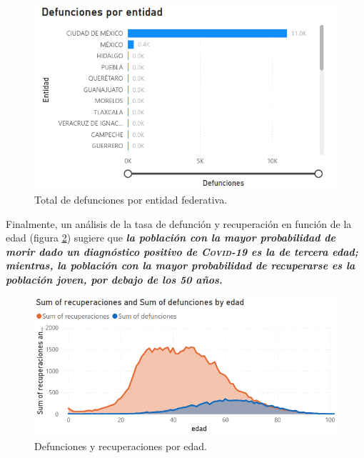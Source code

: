 \documentclass[a4paper,12pt]{article}
\begin{document}
\begin{figure}[!ht]
    \begin{center}
	\includegraphics[scale=0.8]{Def_por_entidad_powerbi.png}
    \end{center}
    \captionsetup{width=\linewidth}
    \caption{Total de defunciones por entidad federativa.}
    \label{fig:def_por_entidad}
\end{figure}

Finalmente, un análisis de la tasa de defunción y recuperación en función de la edad (figura \ref{fig:def_rec_por_edad}) sugiere que {\bfseries {\slshape la población con la mayor probabilidad de morir dado un diagnóstico positivo de {\scshape Covid-19} es la de tercera edad; mientras, la población con la mayor probabilidad de recuperarse es la población joven, por debajo de los 50 años.}}

\begin{figure}[!ht]
    \begin{center}
	\includegraphics[scale=0.8]{Def_rec_por_edad.png}
    \end{center}
    \captionsetup{width=\linewidth}
    \caption{Defunciones y recuperaciones por edad.}
    \label{fig:def_rec_por_edad}
\end{figure}
\end{document}
